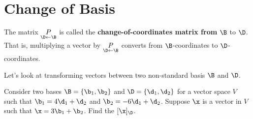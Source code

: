 
\section{Change of Basis}
\label{sec:change_of_basis}

\begin{definition}
  \label{def:change_of_coordinates_matrix}

  The matrix $\underset{\D \leftarrow \B}{P}$ is called the
  \textbf{change-of-coordinates matrix from} $\B$ to $\D$. That is, multiplying
  a vector by $\underset{\D \leftarrow \B}{P}$ converts from $\B$-coordinates to
  $\D$-coordinates.
\end{definition}

Let's look at transforming vectors between two non-standard basis $\B$ and $\D$.

\begin{question}
  \label{qst:transforming_vectors_between_two_non_standard_basis}

  Consider two bases $\B = \{\b_1, \b_2\}$ and $\D = \{\d_1, \d_2\}$ for a
  vector space $V$ such that $\b_1 = 4\d_1 + \d_2$ and $\b_2 = -6\d_1 + \d_2$.
  Suppose $\x$ is a vector in $V$ such that $\x = 3\b_1 + \b_2$. Find the
  $[\x]_\D$.
\end{question}

